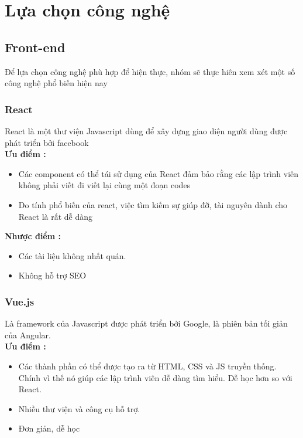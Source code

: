 
\section{Lựa chọn công nghệ}
\subsection{Front-end}
Để lựa chọn công nghệ phù hợp để hiện thực, nhóm sẽ thực hiên xem xét một số công nghệ phổ biến hiện nay

\subsubsection{React}
\hspace*{0.5cm} React là một thư viện Javascript dùng để xây dựng giao diện người dùng được phát triển bởi facebook\\

\textbf{Ưu điểm \cite{technologyFE}:}
\begin{itemize}
    \item Các component có thể tái sử dụng của React đảm bảo rằng các lập trình viên không phải viết đi viết lại cùng một đoạn codes
    \item Do tính phổ biến của react, việc tìm kiếm sự giúp đỡ, tài nguyên dành cho React là rất dễ dàng
\end{itemize}

\textbf{Nhược điểm \cite{technologyFE}:}
\begin{itemize}
    \item Các tài liệu không nhất quán.
    \item Không hỗ trợ SEO
\end{itemize}

\subsubsection{Vue.js}

\hspace*{0.5cm} Là framework của Javascript được phát triển bởi Google, là phiên bản tối giản của Angular.    \\


\textbf{Ưu điểm \cite{technologyFE}:}
\begin{itemize}
    \item Các thành phần có thể được tạo ra từ HTML, CSS và JS truyền thống. Chính vì thế nó giúp các lập trình viên dễ dàng tìm hiểu. Dễ học hơn so với React.
    \item Nhiều thư viện và công cụ hỗ trợ.
    \item Đơn giản, dễ học
\end{itemize}

